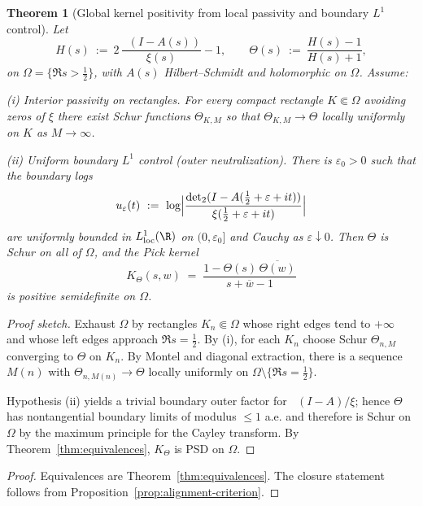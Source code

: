 \documentclass[11pt]{article}
\newtheorem{theorem}{Theorem}
\theoremstyle{remark}
\DeclareMathOperator{\dettwo}{det_2}
\begin{document}
\begin{theorem}[Global kernel positivity from local passivity and boundary $L^1$ control]\label{thm:global-PSD}
Let
\[
  H(s)\ :=\ 2\,\frac{\dettwo(I-A(s))}{\xi(s)}-1,\qquad
  \Theta(s)\ :=\ \frac{H(s)-1}{H(s)+1},
\]
on $\Omega=\{\Re s>\tfrac12\}$, with $A(s)$ Hilbert--Schmidt and holomorphic on $\Omega$.
Assume:

\smallskip
\noindent\emph{(i) Interior passivity on rectangles.} For every compact rectangle $K\Subset\Omega$ avoiding zeros of $\xi$ there exist Schur functions $\Theta_{K,M}$ so that $\Theta_{K,M}\to\Theta$ locally uniformly on $K$ as $M\to\infty$.

\noindent\emph{(ii) Uniform boundary $L^1$ control (outer neutralization).} There is $\varepsilon_0>0$ such that the boundary logs
\[
  u_\varepsilon(t)\ :=\ \log\Bigl|\frac{\dettwo(I-A(\tfrac12+\varepsilon+it))}{\xi(\tfrac12+\varepsilon+it)}\Bigr|
\]
are uniformly bounded in $L^1_{\mathrm{loc}}(\R)$ on $(0,\varepsilon_0]$ and Cauchy as $\varepsilon\downarrow0$.
Then $\Theta$ is Schur on all of $\Omega$, and the Pick kernel
\[
  K_\Theta(s,w)\;=\;\frac{1-\Theta(s)\,\overline{\Theta(w)}}{s+\overline{w}-1}
\]
is positive semidefinite on $\Omega$.
\end{theorem}

\begin{proof}[Proof sketch]
Exhaust $\Omega$ by rectangles $K_n\Subset\Omega$ whose right edges tend to $+\infty$ and whose left edges approach $\Re s=\tfrac12$.
By (i), for each $K_n$ choose Schur $\Theta_{n,M}$ converging to $\Theta$ on $K_n$.
By Montel and diagonal extraction, there is a sequence $M(n)$ with $\Theta_{n,M(n)}\to\Theta$ locally uniformly on $\Omega\setminus\{\Re s=\tfrac12\}$.

Hypothesis (ii) yields a trivial boundary outer factor for $\dettwo(I-A)/\xi$; hence $\Theta$ has nontangential boundary limits of modulus $\le1$ a.e. and therefore is Schur on $\Omega$ by the maximum principle for the Cayley transform.
By Theorem~\ref{thm:equivalences}, $K_\Theta$ is PSD on $\Omega$.
\end{proof}
\begin{proof}
Equivalences are Theorem~\ref{thm:equivalences}. The closure statement follows from Proposition~\ref{prop:alignment-criterion}.
\end{proof}
\end{document}
